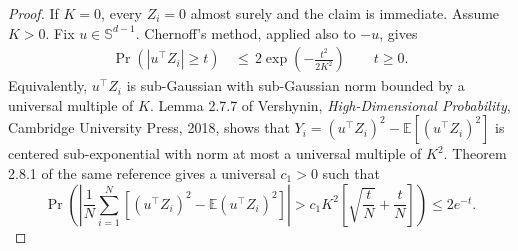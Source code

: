 \documentclass{article} %
\begin{document}
\begin{proof}
If \(K=0\), every \(Z_i=0\) almost surely and the claim is immediate.
Assume \(K>0\). Fix \(u\in\mathbb S^{d-1}\). Chernoff's method, applied also to \(-u\),
gives
\begin{equation}
\begin{aligned}
\Pr(|u^\top Z_i|\ge t)
&\,\leq\,
2\exp\!\left(-\frac{t^2}{2K^2}\right)
\qquad t\ge0.
\end{aligned}
\end{equation}
Equivalently, \(u^\top Z_i\) is sub-Gaussian with sub-Gaussian norm bounded by
a universal multiple of \(K\). Lemma 2.7.7 of Vershynin,
\emph{High-Dimensional Probability}, Cambridge University Press, 2018, shows
that \(Y_i=(u^\top Z_i)^2-\mathbb E[(u^\top Z_i)^2]\) is centered
sub-exponential with norm at most a universal multiple of \(K^2\).
Theorem 2.8.1 of the same reference gives a universal \(c_1>0\) such that
\begin{equation}
\Pr\!\left(
\left|
\frac1N\sum_{i=1}^N
\left[
(u^\top Z_i)^2-\mathbb{E}(u^\top Z_i)^2
\right]
\right|
>
c_1K^2
\left[
\sqrt{\frac{t}{N}}+\frac{t}{N}
\right]
\right)
\leq
2e^{-t}.
\end{equation}


\end{proof}
\end{document}
